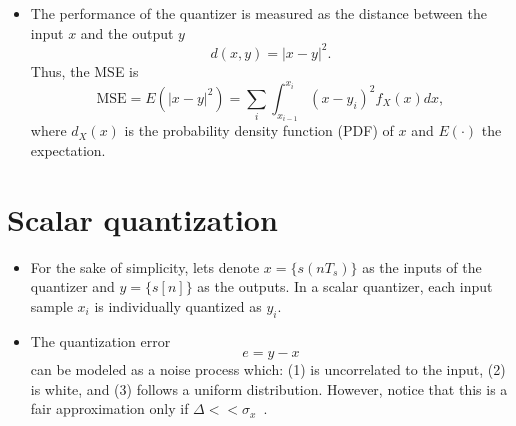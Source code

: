 \begin{itemize}
\item The performance of the quantizer is measured as the distance
  between the input $x$ and the output $y$
  \begin{equation*}
    d(x,y) = |x-y|^2.
  \end{equation*}
  Thus, the MSE is
  \begin{equation}
    \text{MSE} = E(|x-y|^2)=\sum_i\int_{x_{i-1}}^{x_i} (x-y_i)^2f_X(x)dx,
  \end{equation}
  where $d_X(x)$ is the probability density function (PDF) of $x$ and
  $E(\cdot)$ the expectation.

\end{itemize}

\section{Scalar quantization}
\begin{itemize}
\item For the sake of simplicity, lets denote $x=\{s(nT_s)\}$ as the
  inputs of the quantizer and $y=\{s[n]\}$ as the outputs. In a scalar
  quantizer, each input sample $x_i$ is individually quantized as
  $y_i$.
  
\item The quantization error
  \begin{equation}
    e=y-x
  \end{equation}
  can be modeled as a noise process which: (1) is uncorrelated to the
  input, (2) is white, and (3) follows a uniform
  distribution. However, notice that this is a fair approximation only
  if $\Delta<<\sigma_x$~\cite{vetterli1995wavelets}.

\end{itemize}

